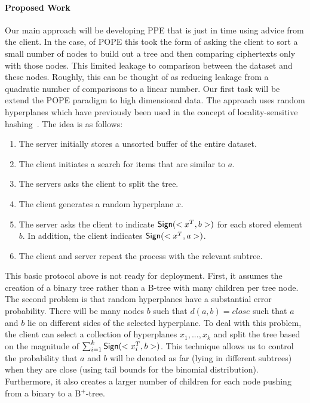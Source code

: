 \paragraph{Proposed Work}
Our main approach will be developing PPE that is just in time using advice from the client.  In the case, of POPE this took the form of asking the client to sort a small number of nodes to build out a tree and then comparing ciphertexts only with those nodes.  This limited leakage to comparison between the dataset and these nodes.  Roughly, this can be thought of as reducing leakage from a quadratic number of comparisons to a linear number.  Our first task will be extend the POPE paradigm to high dimensional data.  The approach uses random hyperplanes which have previously been used in the concept of locality-sensitive hashing~\cite{charikar2002similarity}.  The idea is as follows:

\begin{enumerate}
\item The server initially stores a unsorted buffer of the entire dataset.
\item The client initiates a search for items that are similar to $a$.
\item The servers asks the client to split the tree.
\item The client generates a random hyperplane $x$.  
\item The server asks the client to indicate $\mathsf{Sign}(<x^T,b>)$ for each stored element $b$. In addition, the client indicates $\mathsf{Sign}(<x^T,a>)$.
\item The client and server repeat the process with the relevant subtree.
\end{enumerate} 

This basic protocol above is not ready for deployment.  First, it assumes the creation of a binary tree rather than a B-tree with many children per tree node. The second problem is that random hyperplanes have a substantial error probability.  There will be many nodes $b$ such that $d(a, b)=close$ such that $a$ and $b$ lie on different sides of the selected hyperplane.  To deal with this problem, the client can select a collection of hyperplanes $x_1,..., x_k$ and split the tree based on the magnitude of $\sum_{i=1}^k \mathsf{Sign}(<x_i^T, b>)$.  This technique allows us to control the probability that $a$ and $b$ will be denoted as far (lying in different subtrees) when they are close (using tail bounds for the binomial distribution).  Furthermore, it also creates a larger number of children for each node pushing from a binary to a B$^+$-tree.